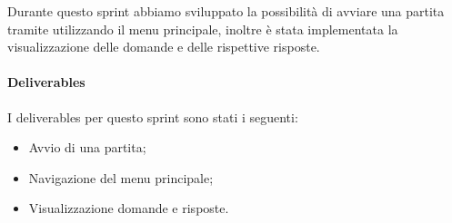 Durante questo sprint abbiamo sviluppato la possibilità di avviare una partita tramite utilizzando il menu principale, inoltre è stata implementata la visualizzazione delle domande e delle rispettive risposte.
\paragraph{Deliverables} 
I deliverables per questo sprint sono stati i seguenti:
\begin{itemize}
    \item Avvio di una partita;
    \item Navigazione del menu principale;
    \item Visualizzazione domande e risposte.
\end{itemize}
